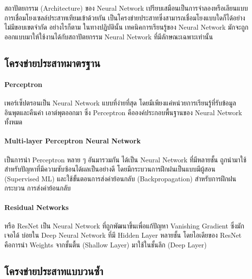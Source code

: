 สถาปัตยกรรม (Architecture) ของ Neural Network เปรียบเสมือนเป็นการจำลองหรือเลียนแบบการเชื่อมโยงเซลล์ประสาทเทียมเข้าด้วยกัน%
เป็นโครงข่ายประสาทซึ่งสามารถเชื่อมโยงแบบใดก็ได้อย่างไม่มีขอบเขตจำกัด อย่างไรก็ตาม ในทางปฏิบัตินั้น เทคนิคการเรียนรู้ของ Neural Network 
มักจะถูกออกแบบมาให้ใช้งานได้กับสถาปัตยกรรม Neural Network ที่มีลักษณะเฉพาะเท่านั้น

\subsection{โครงข่ายประสาทมาตรฐาน}
\label{ssec:std_nn}

\paragraph{Perceptron} เพอร์เซ็ปตรอนเป็น Neural Network แบบที่ง่ายที่สุด โดยมีเพียงแค่หน่วยการเรียนรู้ที่รับข้อมูลอินพุตและคืนค่า%
เอาต์พุตออกมา ซึ่ง Perceptron คือองค์ประกอบพื้นฐานของ Neural Network ทั้งหมด

\paragraph{Multi-layer Perceptron Neural Network}
เป็นการนำ Perceptron หลาย ๆ อันมารวมกัน ได้เป็น Neural Network ที่มีหลายชั้น ถูกนำมาใช้สำหรับปัญหาที่มีความซับซ้อนได้ผลเป็นอย่างดี 
โดยมีกระบวนการฝึกฝนเป็นแบบมีผู้สอน (Supervised ML) และใช้ขั้นตอนการส่งค่าย้อนกลับ (Backpropagation) สำหรับการฝึกฝนกระบวน%
การส่งค่าย้อนกลับ

\paragraph{Residual Networks} หรือ ResNet เป็น Neural Network ที่ถูกพัฒนาขึ้นเพื่อแก้ปัญหา Vanishing Gradient ซึ่งมักเจอได้%
บ่อยใน Deep Neural Network ที่มี Hidden Layer หลายชั้น โดยไอเดียของ ResNet คือการนำ Weights จากชั้นตื้น (Shallow Layer) 
มาใช้ในชั้นลึก (Deep Layer)

\subsection{โครงข่ายประสาทแบบวนซ้ำ}
\label{ssec:rnn}

